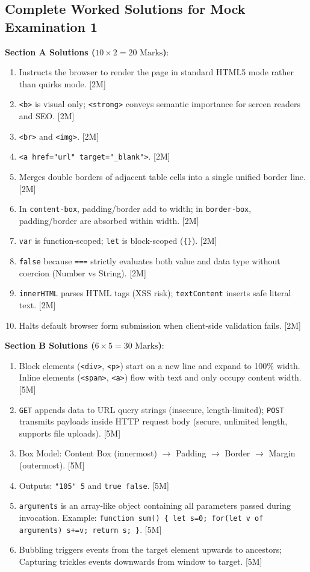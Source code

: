 \subsection{Complete Worked Solutions for Mock Examination 1}

\begin{solutionbox}
\noindent\textbf{Section A Solutions ($10 \times 2 = 20\text{ Marks}$)}:
\begin{enumerate}
    \item Instructs the browser to render the page in standard HTML5 mode rather than quirks mode. [2M]
    \item \texttt{<b>} is visual only; \texttt{<strong>} conveys semantic importance for screen readers and SEO. [2M]
    \item \texttt{<br>} and \texttt{<img>}. [2M]
    \item \texttt{<a href="url" target="\_blank">}. [2M]
    \item Merges double borders of adjacent table cells into a single unified border line. [2M]
    \item In \texttt{content-box}, padding/border add to width; in \texttt{border-box}, padding/border are absorbed within width. [2M]
    \item \texttt{var} is function-scoped; \texttt{let} is block-scoped (\texttt{\{\}}). [2M]
    \item \texttt{false} because \texttt{===} strictly evaluates both value and data type without coercion (Number vs String). [2M]
    \item \texttt{innerHTML} parses HTML tags (XSS risk); \texttt{textContent} inserts safe literal text. [2M]
    \item Halts default browser form submission when client-side validation fails. [2M]
\end{enumerate}

\medskip
\noindent\textbf{Section B Solutions ($6 \times 5 = 30\text{ Marks}$)}:
\begin{enumerate}[start=11]
    \item Block elements (\texttt{<div>}, \texttt{<p>}) start on a new line and expand to 100\% width. Inline elements (\texttt{<span>}, \texttt{<a>}) flow with text and only occupy content width. [5M]
    \item \texttt{GET} appends data to URL query strings (insecure, length-limited); \texttt{POST} transmits payloads inside HTTP request body (secure, unlimited length, supports file uploads). [5M]
    \item Box Model: Content Box (innermost) $\to$ Padding $\to$ Border $\to$ Margin (outermost). [5M]
    \item Outputs: \texttt{"105" 5} and \texttt{true false}. [5M]
    \item \texttt{arguments} is an array-like object containing all parameters passed during invocation. Example: \texttt{function sum() \{ let s=0; for(let v of arguments) s+=v; return s; \}}. [5M]
    \item Bubbling triggers events from the target element upwards to ancestors; Capturing trickles events downwards from window to target. [5M]
\end{enumerate}


\end{solutionbox}
